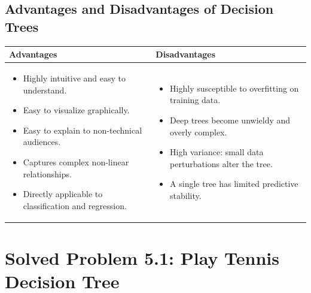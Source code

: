 \subsection{Advantages and Disadvantages of Decision Trees}

\begin{center}\renewcommand{\arraystretch}{1.35}
\begin{tabular}{p{} p{}}
\toprule
\textbf{Advantages} & \textbf{Disadvantages} \\
\midrule
\begin{itemize}[leftmargin=*, nosep]
    \item Highly intuitive and easy to understand.
    \item Easy to visualize graphically.
    \item Easy to explain to non-technical audiences.
    \item Captures complex non-linear relationships.
    \item Directly applicable to classification and regression.
\end{itemize}
&
\begin{itemize}[leftmargin=*, nosep]
    \item Highly susceptible to overfitting on training data.
    \item Deep trees become unwieldy and overly complex.
    \item High variance: small data perturbations alter the tree.
    \item A single tree has limited predictive stability.
\end{itemize} \\
\bottomrule
\end{tabular}
\end{center}

\section{Solved Problem 5.1: Play Tennis Decision Tree}

